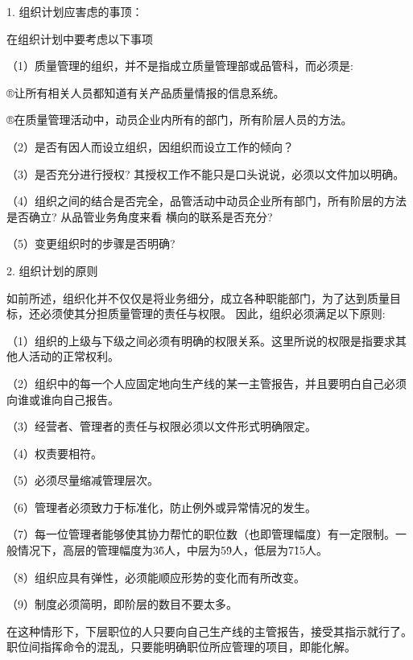     1. 组织计划应害虑的事顶：

    在组织计划中要考虑以下事项

    （1）质量管理的组织，并不是指成立质量管理部或品管科，而必须是:

    ®让所有相关人员都知道有关产品质量情报的信息系统。

    ®在质量管理活动中，动员企业内所有的部门，所有阶层人员的方法。

    （2）是否有因人而设立组织，因组织而设立工作的倾向？

    （3）是否充分进行授权? 其授权工作不能只是口头说说，必须以文件加以明确。

    （4）组织之间的结合是否完全，品管活动中动员企业所有部门，所有阶层的方法是否确立? 从品管业务角度来看 横向的联系是否充分?

    （5）变更组织时的步骤是否明确?

    2. 组织计划的原则

    如前所述，组织化并不仅仅是将业务细分，成立各种职能部门，为了达到质量目标，还必须使其分担质量管理的责任与权限。 因此，组织必须满足以下原则:

    （1）组织的上级与下级之间必须有明确的权限关系。这里所说的权限是指要求其他人活动的正常权利。

    （2）组织中的每一个人应固定地向生产线的某一主管报告，并且要明白自己必须向谁或谁向自己报告。

    （3）经营者、管理者的责任与权限必须以文件形式明确限定。

    （4）权责要相符。

    （5）必须尽量缩减管理层次。

    （6）管理者必须致力于标准化，防止例外或异常情况的发生。

    （7）每一位管理者能够使其协力帮忙的职位数（也即管理幅度）有一定限制。一般情况下，高层的管理幅度为3\~6人，中层为5\~9人，低层为7\~15人。

    （8）组织应具有弹性，必须能顺应形势的变化而有所改变。

    （9）制度必须简明，即阶层的数目不要太多。

    在这种情形下，下层职位的人只要向自己生产线的主管报告，接受其指示就行了。职位间指挥命令的混乱，只要能明确职位所应管理的项目，即能化解。
